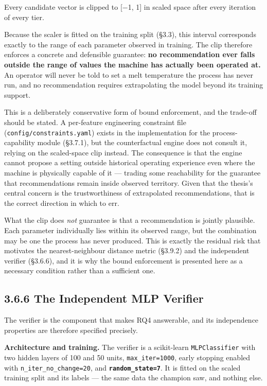 Every candidate vector is clipped to {[}−1, 1{]} in scaled space after every iteration of every tier.

Because the scaler is fitted on the training split (§3.3), this interval corresponds exactly to the range of each parameter observed in training. The clip therefore enforces a concrete and defensible guarantee: \textbf{no recommendation ever falls outside the range of values the machine has actually been operated at.} An operator will never be told to set a melt temperature the process has never run, and no recommendation requires extrapolating the model beyond its training support.

This is a deliberately conservative form of bound enforcement, and the trade-off should be stated. A per-feature engineering constraint file (\texttt{config/constraints.yaml}) exists in the implementation for the process-capability module (§3.7.1), but the counterfactual engine does not consult it, relying on the scaled-space clip instead. The consequence is that the engine cannot propose a setting outside historical operating experience even where the machine is physically capable of it --- trading some reachability for the guarantee that recommendations remain inside observed territory. Given that the thesis's central concern is the trustworthiness of extrapolated recommendations, that is the correct direction in which to err.

What the clip does \emph{not} guarantee is that a recommendation is jointly plausible. Each parameter individually lies within its observed range, but the combination may be one the process has never produced. This is exactly the residual risk that motivates the nearest-neighbour distance metric (§3.9.2) and the independent verifier (§3.6.6), and it is why the bound enforcement is presented here as a necessary condition rather than a sufficient one.

\hypertarget{the-independent-mlp-verifier}{%
\subsection{3.6.6 The Independent MLP Verifier}\label{the-independent-mlp-verifier}}

The verifier is the component that makes RQ4 answerable, and its independence properties are therefore specified precisely.

\textbf{Architecture and training.} The verifier is a scikit-learn \texttt{MLPClassifier} with two hidden layers of 100 and 50 units, \texttt{max\_iter=1000}, early stopping enabled with \texttt{n\_iter\_no\_change=20}, and \textbf{\texttt{random\_state=7}}. It is fitted on the scaled training split and its labels --- the same data the champion saw, and nothing else.

